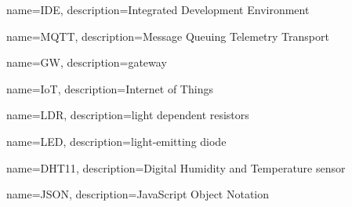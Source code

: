 \makeglossaries


{
    name={IDE},
    description={Integrated Development Environment}
}

{
    name={MQTT},
    description={Message Queuing Telemetry Transport}
}

{
    name={GW},
    description={gateway}
}

{
    name={IoT},
    description={Internet of Things}
}

{
    name={LDR},
    description={light dependent resistors}
}

{
    name={LED},
    description={light-emitting diode}
}

{
    name={DHT11},
    description={Digital Humidity and Temperature sensor}
}

{
    name={JSON},
    description={JavaScript Object Notation}
}